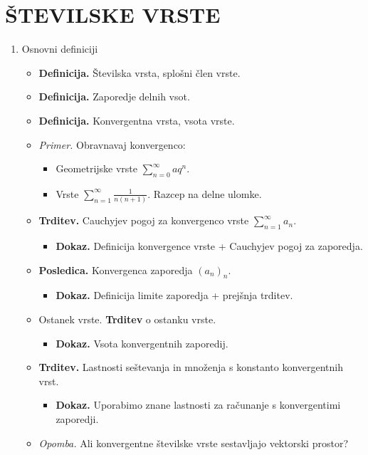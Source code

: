 \section{ŠTEVILSKE VRSTE}

\begin{enumerate}
    \item Osnovni definiciji
    \begin{itemize}
        \item  \colorbox{purple!30}{\textbf{Definicija.}} Številska vrsta, splošni člen vrste.
        \item  \colorbox{purple!30}{\textbf{Definicija.}} Zaporedje delnih vsot.
        \item  \colorbox{purple!30}{\textbf{Definicija.}} Konvergentna vrsta, vsota vrste.
        \item \colorbox{yellow!30}{\emph{Primer.}} Obravnavaj konvergenco:
        \begin{itemize}
            \item Geometrijske vrste $\sum_{n=0}^{\infty} aq^n$.
            \item Vrste $\sum_{n=1}^{\infty} \frac{1}{n(n+1)}$. Razcep na delne ulomke.
        \end{itemize}
        \item \colorbox{blue!30}{\textbf{Trditev.}} Cauchyjev pogoj za konvergenco vrste $\sum_{n=1}^{\infty} a_n$.
        \begin{itemize}
            \item \colorbox{green!30}{\textbf{Dokaz.}} Definicija konvergence vrste + Cauchyjev pogoj za zaporedja.
        \end{itemize}        
        \item \colorbox{orange!30}{\textbf{Posledica.}} Konvergenca zaporedja $(a_n)_n$.
        \begin{itemize}
            \item \colorbox{green!30}{\textbf{Dokaz.}} Definicija limite zaporedja + prejšnja trditev.
        \end{itemize}   
        \item Ostanek vrste. \colorbox{blue!30}{\textbf{Trditev}} o ostanku vrste.
        \begin{itemize}
            \item \colorbox{green!30}{\textbf{Dokaz.}} Vsota konvergentnih zaporedij.
        \end{itemize}  
        \item  \colorbox{blue!30}{\textbf{Trditev.}}  Lastnosti seštevanja in množenja s konstanto konvergentnih vrst.
        \begin{itemize}
            \item \colorbox{green!30}{\textbf{Dokaz.}} Uporabimo znane lastnosti za računanje s konvergentimi zaporedji.
        \end{itemize}
        \item \colorbox{yellow!30}{\emph{Opomba.}} Ali konvergentne številske vrste sestavljajo vektorski prostor?
    \end{itemize}


\end{enumerate}
